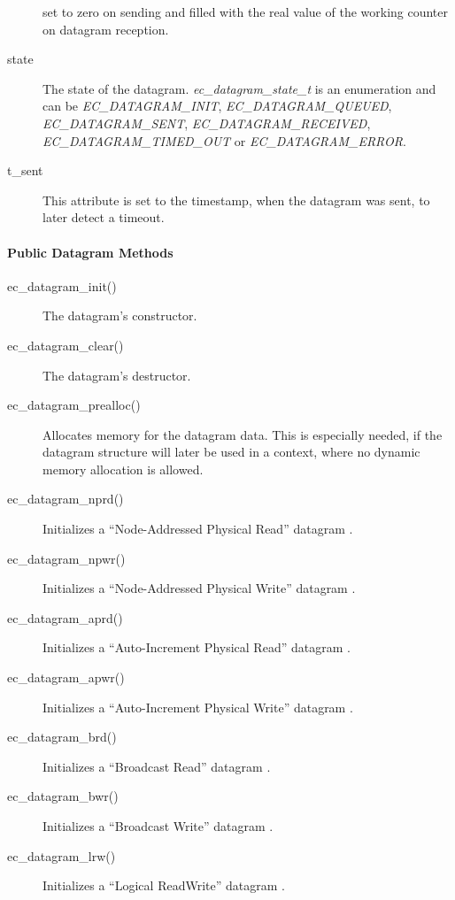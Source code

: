 \documentclass[a4paper,12pt,BCOR6mm,bibtotoc,idxtotoc]{scrbook}
\begin{document}
\begin{description}
  set to zero on sending and filled with the real value of the working
  counter on datagram reception.
\item[state] The state of the datagram.
  \textit{ec\_\-datagram\_\-state\_\-t} is an enumeration and can be
  \textit{EC\_\-DATA\-GRAM\_\-INIT},
  \textit{EC\_\-DATA\-GRAM\_\-QUEU\-ED},
  \textit{EC\_\-DATA\-GR\-AM\_\-SEN\-T},
  \textit{EC\_\-DATA\-GRAM\_\-REC\-EIVED},
  \textit{EC\_\-DATA\-GRAM\_\-TIMED\_\-OUT} or
  \textit{EC\_\-DA\-TA\-GRAM\_\-ERR\-OR}.
\item[t\_sent] This attribute is set to the timestamp, when the
  datagram was sent, to later detect a timeout.
\end{description}

\paragraph{Public Datagram Methods}

\begin{description}
\item[ec\_datagram\_init()] The datagram's constructor.
\item[ec\_datagram\_clear()] The datagram's destructor.
\item[ec\_datagram\_prealloc()] Allocates memory for the datagram
  data. This is especially needed, if the datagram structure will
  later be used in a context, where no dynamic memory allocation is
  allowed.
\item[ec\_datagram\_nprd()] Initializes a ``Node-Addressed Physical
  Read'' datagram \cite[section~5.4.1.2]{dlspec}.
\item[ec\_datagram\_npwr()] Initializes a ``Node-Addressed Physical
  Write'' datagram \cite[section~5.4.2.2]{dlspec}.
\item[ec\_datagram\_aprd()] Initializes a ``Auto-Increment Physical
  Read'' datagram \cite[section~5.4.1.1]{dlspec}.
\item[ec\_datagram\_apwr()] Initializes a ``Auto-Increment Physical
  Write'' datagram \cite[section~5.4.2.1]{dlspec}.
\item[ec\_datagram\_brd()] Initializes a ``Broadcast Read'' datagram
  \cite[section~5.4.1.3]{dlspec}.
\item[ec\_datagram\_bwr()] Initializes a ``Broadcast Write'' datagram
  \cite[section~5.4.2.3]{dlspec}.
\item[ec\_datagram\_lrw()] Initializes a ``Logical ReadWrite''
  datagram \cite[section~5.4.3.4]{dlspec}.
\end{description}
\end{document}
